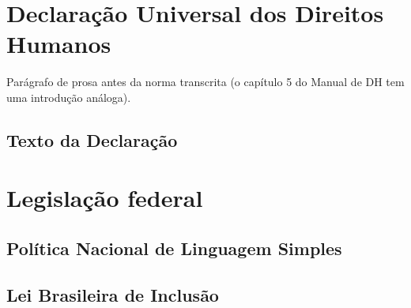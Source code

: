 \documentclass[11pt,a5paper,twoside,openany]{book}
\begin{document}
\TOCAcessivel
\mainmatter

\chapter{Declaração Universal dos Direitos Humanos}

Parágrafo de prosa antes da norma transcrita (o capítulo 5 do
Manual de DH tem uma introdução análoga).

\section{Texto da Declaração}


\chapter{Legislação federal}

\section{Política Nacional de Linguagem Simples}


\section{Lei Brasileira de Inclusão}

\end{document}

